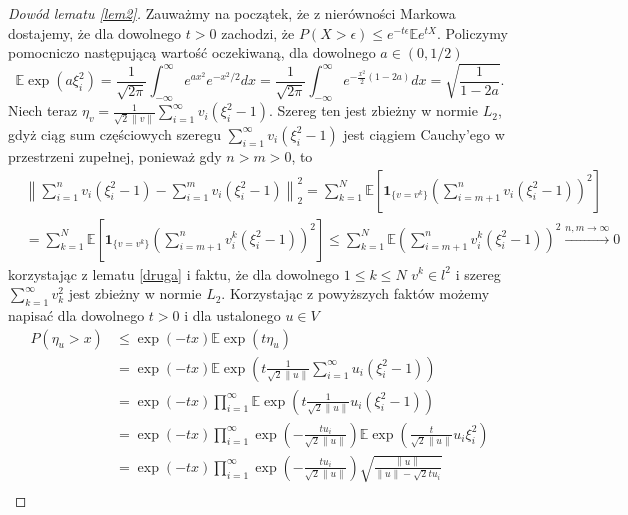\documentclass[man,mfiu]{mgrwms}
\newcommand{\norm}[1]{\left\lVert#1\right\rVert}
\begin{document}
\begin{proof}[Dowód lematu \ref{lem2}]
Zauważmy na początek, że z nierówności Markowa dostajemy, że dla dowolnego $t>0$ zachodzi, że $P(X>\epsilon)\leq e^{-t\epsilon}\mathbb{E}e^{tX}$. Policzymy pomocniczo następującą wartość oczekiwaną, dla dowolnego $a\in (0,1/2)$
\begin{displaymath}
\mathbb{E}\exp (a\xi_i^2)=\frac{1}{\sqrt{2\pi}}\int_{-\infty}^{\infty}e^{ax^2}e^{-x^2/2}dx=\frac{1}{\sqrt{2\pi}}\int_{-\infty}^{\infty}e^{-\frac{x^2}{2}(1-2a)}dx=\sqrt{\frac{1}{1-2a}}.
\end{displaymath}
Niech teraz $\eta_v=\frac{1}{\sqrt{2}\norm{v}}\sum_{i=1}^{\infty}v_i(\xi_i^2-1)$. Szereg ten jest zbieżny w normie $L_2$, gdyż ciąg sum częściowych szeregu $\sum_{i=1}^{\infty}v_i(\xi^2_i-1)$ jest ciągiem Cauchy'ego w przestrzeni zupełnej, ponieważ gdy $n>m>0$, to
\begin{displaymath}
\begin{split}
&\norm{\sum_{i=1}^{n}v_i(\xi^2_i-1)-\sum_{i=1}^{m}v_i(\xi^2_i-1)}_2^2
=\sum_{k=1}^N\mathbb{E}\left[\pmb{1}_{\{v=v^k\}}\left(\sum_{i=m+1}^{n}v_i(\xi^2_i-1)\right)^2\right]\\
&=\sum_{k=1}^N\mathbb{E}\left[\pmb{1}_{\{v=v^k\}}\left(\sum_{i=m+1}^{n}v^k_i(\xi^2_i-1)\right)^2\right]\leq \sum_{k=1}^N\mathbb{E}\left(\sum_{i=m+1}^{n}v^k_i(\xi^2_i-1)\right)^2\stackrel{n,m\to \infty}{\to} 0
\end{split}
\end{displaymath}
korzystając z lematu \ref{druga} i faktu, że dla dowolnego $1\leq k\leq N$ $v^k\in l^2$ i szereg $\sum_{k=1}^{\infty}v_k^2$ jest zbieżny w normie $L_2$. 
 Korzystając z powyższych faktów możemy napisać dla dowolnego $t>0$ i dla ustalonego $u\in V$
\begin{displaymath}
\begin{split}
P(\eta_u>x)&\leq \exp(-tx)\mathbb{E}\exp(t\eta_u)\\
&=\exp(-tx)\mathbb{E}\exp\left(t\frac{1}{\sqrt{2}\norm{u}}\sum_{i=1}^{\infty}u_i(\xi_i^2-1)\right)\\
&=\exp(-tx)\prod_{i=1}^{\infty}\mathbb{E}\exp\left(t\frac{1}{\sqrt{2}\norm{u}}u_i(\xi_i^2-1)\right)\\
&=\exp(-tx)\prod_{i=1}^{\infty}\exp\left(-\frac{tu_i}{\sqrt{2}\norm{u}}\right)\mathbb{E}\exp\left(\frac{t}{\sqrt{2}\norm{u}}u_i\xi_i^2\right)\\
&=\exp(-tx)\prod_{i=1}^{\infty}\exp\left(-\frac{tu_i}{\sqrt{2}\norm{u}}\right)\sqrt{\frac{\norm{u}}{\norm{u}-\sqrt{2}tu_i}}\\

\end{split}
\end{displaymath}
\end{proof}
\end{document}
